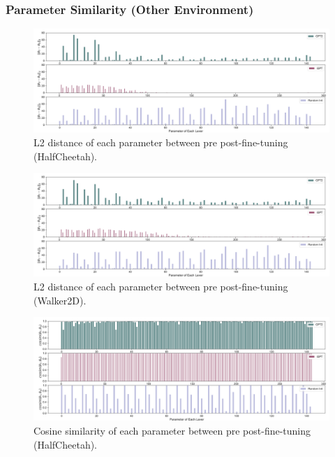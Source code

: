 \documentclass{article}
\begin{document}
\subsubsection{Parameter Similarity (Other Environment)}
\begin{figure}[H]
    \centering
        \includegraphics[width=\linewidth]{figs/paramdist_0_40_gpt2_igpt_dt_halfcheetah_medium_666.pdf}
    \caption{L2 distance of each parameter between pre post-fine-tuning (HalfCheetah).}
\end{figure}

\begin{figure}[H]
    \centering
        \includegraphics[width=\linewidth]{figs/paramdist_0_40_gpt2_igpt_dt_walker2d_medium_666.pdf}
    \caption{L2 distance of each parameter between pre post-fine-tuning (Walker2D).}
\end{figure}

\begin{figure}[H]
    \centering
        \includegraphics[width=\linewidth]{figs/paramcos_0_40_gpt2_igpt_dt_halfcheetah_medium_666.pdf}
    \caption{Cosine similarity of each parameter between pre post-fine-tuning (HalfCheetah).}
\end{figure}
\end{document}
